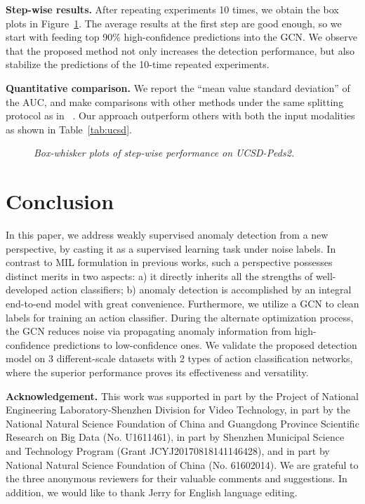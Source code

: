 \documentclass[10pt,twocolumn,letterpaper]{article}
\begin{document}
\textbf{Step-wise results.}
After repeating experiments 10 times, we obtain the box plots in Figure~\ref{fig:ucsd}. The average results at the first step are good enough, so we start with feeding top 90\% high-confidence predictions into the GCN. We observe that the proposed method not only increases the detection performance, but also stabilize the predictions of the 10-time repeated experiments.

\textbf{Quantitative comparison.}
We report the ``mean value  standard deviation'' of the AUC, and make comparisons with other methods under the same splitting protocol as in ~\cite{he2017anomaly}. Our approach outperform others with both the input modalities as shown in Table~\ref{tab:ucsd}.

\begin{figure}[h]
  \centering
    
\caption{\emph{Box-whisker plots of step-wise performance on UCSD-Peds2.}}
  \label{fig:ucsd} 
\end{figure}


\section{Conclusion}
In this paper, we address weakly supervised anomaly detection from a new perspective, by casting it as a supervised learning task under noise labels. In contrast to MIL formulation in previous works, such a perspective possesses distinct merits in two aspects: a) it directly inherits all the strengths of well-developed action classifiers; b) anomaly detection is accomplished by an integral end-to-end model with great convenience. Furthermore, we utilize a GCN to clean labels for training an action classifier. During the alternate optimization process, the GCN reduces noise via propagating anomaly information from high-confidence predictions to low-confidence ones. We validate the proposed detection model on 3 different-scale datasets with 2 types of action classification networks, where the superior performance proves its effectiveness and versatility.   


\noindent\textbf{Acknowledgement.} This work was supported in part by the Project of National Engineering Laboratory-Shenzhen Division for Video Technology, in part by the National Natural Science Foundation of China and Guangdong Province Scientific Research on Big Data (No. U1611461), in part by Shenzhen Municipal Science and Technology Program (Grant JCYJ20170818141146428), and in part by National Natural Science Foundation of China (No. 61602014). We are grateful to the three anonymous reviewers for their valuable comments and suggestions. In addition, we would like to thank Jerry for English language editing.

\newpage
{\small


}




\end{document}
